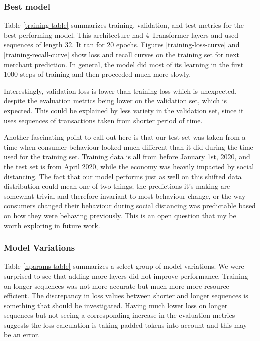 \documentclass{article}
\begin{document}
\subsubsection{Best model}
Table \ref{training-table} summarizes training, validation, and test metrics for the best performing model. This architecture had 4 Transformer layers and used sequences of length 32. It ran for 20 epochs. Figures \ref{training-loss-curve} and \ref{training-recall-curve} show loss and recall curves on the training set for next merchant prediction.  In general, the model did most of its learning in the first 1000 steps of training and then proceeded much more slowly.

Interestingly, validation loss is lower than training loss which is unexpected, despite the evaluation metrics being lower on the validation set, which is expected. This could be explained by less variety in the validation set, since it uses sequences of transactions taken from shorter period of time.

Another fascinating point to call out here is that our test set was taken from a time when consumer behaviour looked much different than it did during the time used for the training set. Training data is all from before January 1st, 2020, and the test set is from April 2020, while the economy was heavily impacted by social distancing. The fact that our model performs just as well on this shifted data distribution could mean one of two things; the predictions it's making are somewhat trivial and  therefore invariant to most behaviour change, or the way consumers changed their behaviour during social distancing was predictable based on how they were behaving previously. This is an open question that my be worth exploring in future work.


\subsubsection{Model Variations}

Table \ref{hparams-table} summarizes a select group of model variations. We were surprised to see that adding more layers did not improve performance. Training on longer sequences was not more accurate but much more more resource-efficient. The discrepancy in loss values between shorter and longer sequences is something that should be investigated. Having much lower loss on longer sequences but not seeing a corresponding increase in the evaluation metrics suggests the loss calculation is taking padded tokens into account and this may be an error.
\end{document}
